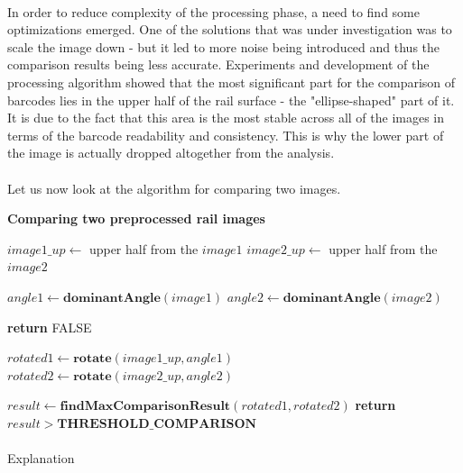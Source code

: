 \paragraph{}
In order to reduce complexity of the processing phase, a need to find some optimizations emerged. One of the solutions that was under investigation was to scale the image down - but it led to more noise being introduced and thus the comparison results being less accurate. Experiments and development of the processing algorithm showed that the most significant part for the comparison of barcodes lies in the upper half of the rail surface - the "ellipse-shaped" part of it. It is due to the fact that this area is the most stable across all of the images in terms of the barcode readability and consistency. This is why the lower part of the image is actually dropped altogether from the analysis.

\paragraph{}
Let us now look at the algorithm for comparing two images. 

\begin{algorithm}{\textbf{Comparing two preprocessed rail images}}
	\begin{spacing}{1.5}
	\begin{algorithmic}[1]
			\State $image1\_up \gets$ upper half from the $image1$
			\State $image2\_up \gets$ upper half from the $image2$
			
			\State $angle1 \gets \textbf{dominantAngle}(image1)$
			\State $angle2 \gets \textbf{dominantAngle}(image2)$
			
				\State \textbf{return} FALSE
			\EndIf
			
			\State $rotated1 \gets \textbf{rotate}(image1\_up, angle1)$
			\State $rotated2 \gets \textbf{rotate}(image2\_up, angle2)$
			
			\State $result \gets \textbf{findMaxComparisonResult}(rotated1, rotated2)$
			\State \textbf{return} $result > \textbf{THRESHOLD\_COMPARISON}$
		\EndFunction
	\end{algorithmic}
	\end{spacing}
\end{algorithm}

\paragraph{}
Explanation


